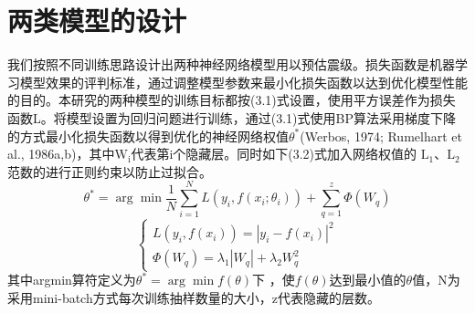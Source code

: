 \section{两类模型的设计}
\indent 我们按照不同训练思路设计出两种神经网络模型用以预估震级。损失函数是机器学习模型效果的评判标准，通过调整模型参数来最小化损失函数以达到优化模型性能的目的。本研究的两种模型的训练目标都按(3.1)式设置，使用平方误差作为损失函数L。将模型设置为回归问题进行训练，通过(3.1)式使用BP算法采用梯度下降的方式最小化损失函数以得到优化的神经网络权值$\theta^{*}$(Werbos, 1974; Rumelhart et al., 1986a,b)，其中$\mathrm{W}_{\mathrm{i}}$代表第i个隐藏层。同时如下(3.2)式加入网络权值的
$\mathrm{L}_{1}$、$\mathrm{L}_{2}$范数的进行正则约束以防止过拟合。\\
\begin{equation}
\theta^{*}=\arg \min \frac{1}{N} \sum_{i=1}^{N} L\left(y_{i}, f\left(x_{i} ; \theta_{i}\right)\right)+\sum_{q=1}^{z} \Phi\left(W_{q}\right)
\end{equation}
\begin{equation}
\left\{\begin{array}{c}{L\left(y_{i}, f\left(x_{i}\right)\right)=\left|y_{i}-f\left(x_{i}\right)\right|^{2}} \\ {\Phi\left(W_{q}\right)=\lambda_{1}\left|W_{q}\right|+\lambda_{2} W_{q}^{2}}\end{array}\right.
\end{equation}
其中arg⁡min算符定义为$\theta^{*}=\arg \min f(\theta)$下
，使$f(\theta)$达到最小值的$\theta$值，N为采用mini-batch方式每次训练抽样数量的大小，z代表隐藏的层数。\\
